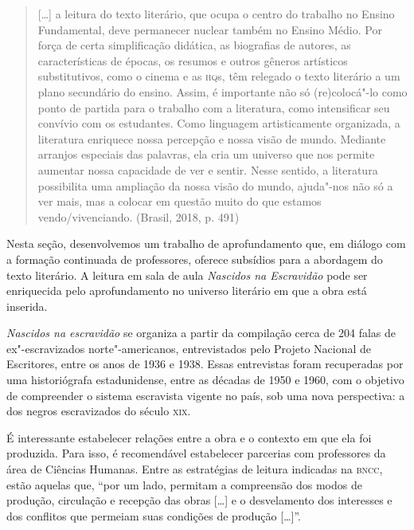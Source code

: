 \documentclass[11pt]{extarticle}
\begin{document}
\begin{quote}
{[}\ldots{}{]} a leitura do texto literário, que ocupa o centro do trabalho
no Ensino Fundamental, deve permanecer nuclear também no Ensino Médio.
Por força de certa simplificação didática, as biografias de autores, as
características de épocas, os resumos e outros gêneros artísticos
substitutivos, como o cinema e as \textsc{hq}s, têm relegado o texto literário a
um plano secundário do ensino. Assim, é importante não só (re)colocá"-lo
como ponto de partida para o trabalho com a literatura, como
intensificar seu convívio com os estudantes. Como linguagem
artisticamente organizada, a literatura enriquece nossa percepção e
nossa visão de mundo. Mediante arranjos especiais das palavras, ela cria
um universo que nos permite aumentar nossa capacidade de ver e sentir.
Nesse sentido, a literatura possibilita uma ampliação da nossa visão do
mundo, ajuda"-nos não só a ver mais, mas a colocar em questão muito do
que estamos vendo/vivenciando. (Brasil, 2018, p. 491)
\end{quote}

Nesta seção, desenvolvemos um trabalho de aprofundamento que, em diálogo
com a formação continuada de professores, oferece subsídios para a
abordagem do texto literário. A leitura em sala de aula \emph{Nascidos
na Escravidão} pode ser enriquecida pelo aprofundamento no universo
literário em que a obra está inserida.

\emph{Nascidos na escravidão} se organiza a partir da compilação cerca
de 204 falas de ex"-escravizados norte"-americanos, entrevistados pelo
Projeto Nacional de Escritores, entre os anos de 1936 e 1938. Essas
entrevistas foram recuperadas por uma historiógrafa estadunidense, entre
as décadas de 1950 e 1960, com o objetivo de compreender o sistema
escravista vigente no país, sob uma nova perspectiva: a dos negros
escravizados do século \textsc{xix}.






É interessante estabelecer relações entre a obra e o contexto em que ela
foi produzida. Para isso, é recomendável estabelecer parcerias com
professores da área de Ciências Humanas. Entre as estratégias de leitura
indicadas na \textsc{bncc}, estão aquelas que, ``por um lado, permitam a
compreensão dos modos de produção, circulação e recepção das obras
{[}\ldots{}{]} e o desvelamento dos interesses e dos conflitos que permeiam
suas condições de produção {[}\ldots{}{]}''.
\end{document}
